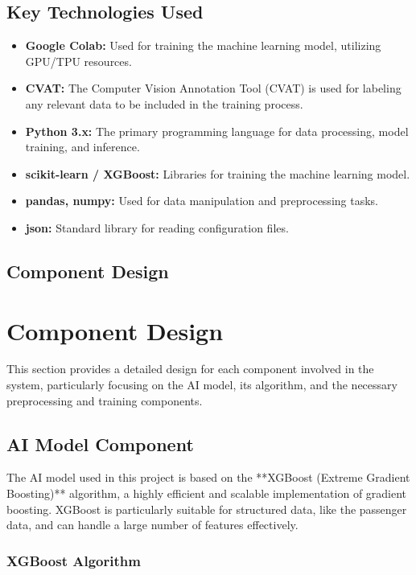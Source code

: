 \documentclass[15pt]{article}
\begin{document}
\subsection{Key Technologies Used}
\begin{itemize}
    \item \textbf{Google Colab:} Used for training the machine learning model, utilizing GPU/TPU resources.
    \item \textbf{CVAT:} The Computer Vision Annotation Tool (CVAT) is used for labeling any relevant data to be included in the training process.
    \item \textbf{Python 3.x:} The primary programming language for data processing, model training, and inference.
    \item \textbf{scikit-learn / XGBoost:} Libraries for training the machine learning model.
    \item \textbf{pandas, numpy:} Used for data manipulation and preprocessing tasks.
    \item \textbf{json:} Standard library for reading configuration files.
\end{itemize}

\subsection{Component Design}
\section{Component Design}

This section provides a detailed design for each component involved in the system, particularly focusing on the AI model, its algorithm, and the necessary preprocessing and training components.

\subsection{AI Model Component}

The AI model used in this project is based on the **XGBoost (Extreme Gradient Boosting)** algorithm, a highly efficient and scalable implementation of gradient boosting. XGBoost is particularly suitable for structured data, like the passenger data, and can handle a large number of features effectively.

\subsubsection{XGBoost Algorithm}
\end{document}

